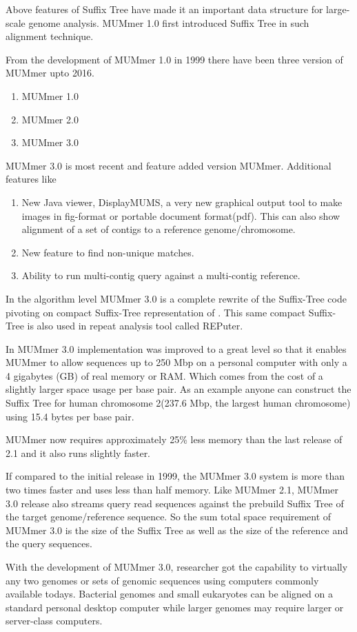 \documentclass{standalone}
\begin{document}
\par 
Above features of Suffix Tree have made it an important  data structure for large-scale genome analysis. MUMmer 1.0 first introduced Suffix Tree in such alignment technique.
\par 
From the development of MUMmer 1.0 in 1999 there have been three version of MUMmer upto 2016.
\begin{enumerate}
	\item MUMmer 1.0 \cite{MUMmer1}
	\item MUMmer 2.0 \cite{MUMmer2}
	\item MUMmer 3.0 \cite{MUMmer3}
\end{enumerate}
MUMmer 3.0 is most recent and feature added version MUMmer. Additional features like 
\begin{enumerate}
	\item New Java viewer, DisplayMUMS, a very new graphical output tool to make images in fig-format or portable document format(pdf). This can also show alignment of a set of contigs to a reference genome/chromosome.
	\item New feature to find non-unique matches.
	\item Ability to run multi-contig query against a multi-contig reference.
\end{enumerate}
In the algorithm level MUMmer 3.0 is a complete rewrite of the Suffix-Tree code pivoting on compact Suffix-Tree representation of \cite{RSST}. This same compact Suffix-Tree is also used in repeat analysis tool called REPuter\cite{REPuter}.
\par
In MUMmer 3.0 implementation was improved to a great level so that it enables MUMmer to allow sequences up to 250 Mbp on a personal computer with only a 4 gigabytes (GB) of real memory or RAM. Which comes from the cost of a slightly larger space usage per base pair. As an example anyone can construct the Suffix Tree for human chromosome 2(237.6 Mbp, the largest human chromosome) using 15.4 bytes per base pair.
\par   
MUMmer now requires approximately 25\% less memory than the last release of 2.1 and it also runs slightly faster.
\par 
If compared to the initial release in 1999, the MUMmer 3.0 system is more than two times faster and uses less than half memory. Like MUMmer 2.1, MUMmer 3.0 release also streams query read sequences  against the prebuild Suffix Tree of the target genome/reference sequence. So the sum total space requirement of MUMmer 3.0 is the size of the Suffix Tree as well as the size of the reference and the query sequences.
\par 
With the development of MUMmer 3.0, researcher got the capability to virtually any two genomes or sets of genomic sequences using computers commonly available todays. Bacterial genomes and small eukaryotes can be aligned on a standard personal desktop computer while larger genomes may require larger or server-class computers.
\end{document}
